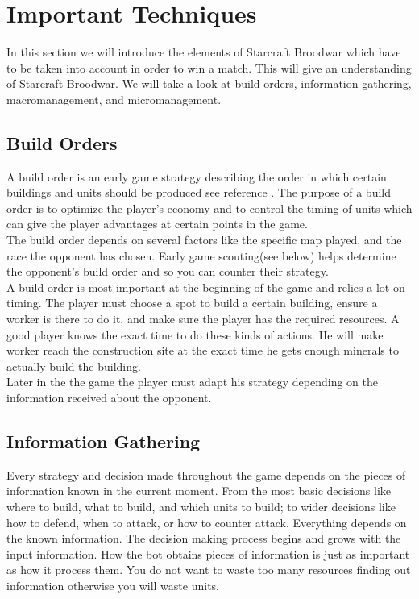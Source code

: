 \section{Important Techniques}
In this section we will introduce the elements of Starcraft Broodwar which have to be taken into account in order to win a match. This will give an understanding 
of Starcraft Broodwar. We will take a look at build orders, information gathering, macromanagement, and
micromanagement.

	\subsection{Build Orders}
		A build order is an early game strategy describing the order in which certain buildings and units should be produced see reference \cite{wiki_build_order}. 
		The purpose of a build order is to optimize the player's economy and to control the timing of units which can give 
		the player advantages at certain points in the game.\\

		The build order depends on several factors like the specific map played, and the race the opponent has chosen. 
		Early game scouting(see below) helps determine the opponent's build order and so you can counter their strategy.\\
		
		A build order is most important at the beginning of the game and relies a lot on timing. 
		The player must choose a spot to build a certain building, ensure a worker is there to do it, 
		and make sure the player has the required resources. 
		A good player knows the exact time to do these kinds of actions. 
		He will make worker reach the construction site at the exact time he gets enough minerals to actually build the building.\\
		
		Later in the the game the player must adapt his strategy depending on the information received about the opponent.
	
	\subsection{Information Gathering}
		Every strategy and decision made throughout the game depends on the pieces of information 
		known in the current moment. From the most basic decisions like where to build, what to build, and
		which units to build; to wider decisions like how to defend, when to attack, or how to counter attack.
		Everything depends on the known information. The decision making process begins and grows with the input information.
		How the bot obtains pieces of information is just as important 
		as how it process them. You do not want to waste too many resources finding out information otherwise you will waste units. 
	
